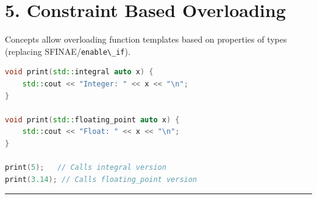 \hypertarget{constraint-based-overloading}{%
\section{5. Constraint Based
Overloading}\label{constraint-based-overloading}}

Concepts allow overloading function templates based on properties of
types (replacing SFINAE/\passthrough{\lstinline!enable\_if!}).

\begin{lstlisting}[language={C++}]
void print(std::integral auto x) {
    std::cout << "Integer: " << x << "\n";
}

void print(std::floating_point auto x) {
    std::cout << "Float: " << x << "\n";
}

print(5);   // Calls integral version
print(3.14); // Calls floating_point version
\end{lstlisting}

\begin{center}\rule{0.5\linewidth}{0.5pt}\end{center}
